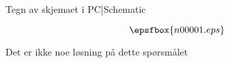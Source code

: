 

Tegn av skjemaet i PC|Schematic

$$\epsfbox{n00001.eps}$$








Det er ikke noe l{\o}sning p{\aa} dette sp{\o}rsm{\aa}let













